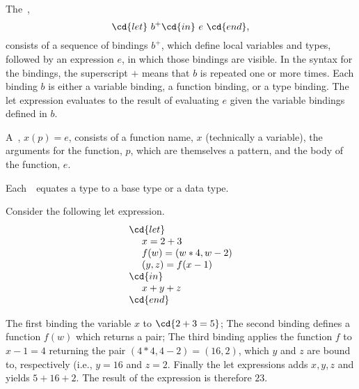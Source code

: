 \begin{cluster}
\label{grp:grm:sparc::bindings}

\begin{gram}[Bindings]
\label{grm:sparc::bindings}
The~, 
\[
\cd{let}~b^+\cd{in}~e~\cd{end},
\] 
consists of a sequence of bindings $b^+$, which define local variables
and types, followed by an expression $e$, in which those bindings are
visible.  In the syntax for the bindings, the superscript $+$ means
that $b$ is repeated one or more times.  Each binding $b$ is either a
variable binding, a function binding, or a type binding.
The let expression evaluates to the result of evaluating $e$ given the
variable bindings defined in $b$.

A~, $x (p) = e$, consists of a function
name, $x$ (technically a variable), the arguments for the function,
$p$, which are themselves a pattern, and the body of the function,
$e$. 


Each~~equates a type to a base type or a data type.

\end{gram}
\end{cluster}

\begin{cluster}
\label{grp:xmpl:sparc::consider}

\begin{example}
\label{xmpl:sparc::consider}
Consider the following let expression.
\[
\begin{array}{l}
\cd{let}\\ 
~~~~x = 2 + 3\\
~~~~f (w) = (w * 4, w - 2)\\
~~~~(y,z) = f(x-1)\\
\cd{in}\\ 
~~~~x + y + z\\
\cd{end} 
\end{array}
\]

The first  binding the variable $x$ to $\cd{2 + 3 = 5}$;
The second binding defines a function $f(w)$ which returns a pair;
The third binding applies the function $f$ to $x - 1 = 4$
returning the pair $(4 * 4, 4 -2) = (16, 2)$, which
  $y$ and $z$ are bound to, respectively (i.e., $y = 16$ and
  $z = 2$.
Finally the let expressions adds $x, y, z$ and yields $5 + 16 + 2$.
The result of the expression is therefore $23$.

\end{example}
\end{cluster}

